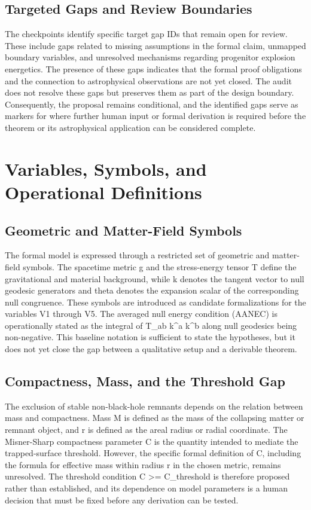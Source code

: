 \documentclass[conference]{IEEEtran}
\begin{document}
\subsection{Targeted Gaps and Review Boundaries}
The checkpoints identify specific target gap IDs that remain open for review. These include gaps related to missing assumptions in the formal claim, unmapped boundary variables, and unresolved mechanisms regarding progenitor explosion energetics. The presence of these gaps indicates that the formal proof obligations and the connection to astrophysical observations are not yet closed. The audit does not resolve these gaps but preserves them as part of the design boundary. Consequently, the proposal remains conditional, and the identified gaps serve as markers for where further human input or formal derivation is required before the theorem or its astrophysical application can be considered complete.

\section{Variables, Symbols, and Operational Definitions}
\subsection{Geometric and Matter-Field Symbols}
The formal model is expressed through a restricted set of geometric and matter-field symbols. The spacetime metric g and the stress-energy tensor T define the gravitational and material background, while k denotes the tangent vector to null geodesic generators and theta denotes the expansion scalar of the corresponding null congruence. These symbols are introduced as candidate formalizations for the variables V1 through V5. The averaged null energy condition (AANEC) is operationally stated as the integral of T\_ab k\textasciicircum{}a k\textasciicircum{}b along null geodesics being non-negative. This baseline notation is sufficient to state the hypotheses, but it does not yet close the gap between a qualitative setup and a derivable theorem.

\subsection{Compactness, Mass, and the Threshold Gap}
The exclusion of stable non-black-hole remnants depends on the relation between mass and compactness. Mass M is defined as the mass of the collapsing matter or remnant object, and r is defined as the areal radius or radial coordinate. The Misner-Sharp compactness parameter C is the quantity intended to mediate the trapped-surface threshold. However, the specific formal definition of C, including the formula for effective mass within radius r in the chosen metric, remains unresolved. The threshold condition C >= C\_threshold is therefore proposed rather than established, and its dependence on model parameters is a human decision that must be fixed before any derivation can be tested.
\end{document}
